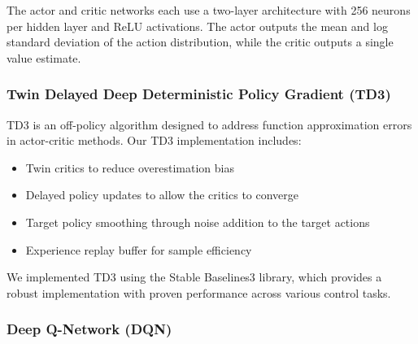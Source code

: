 \documentclass[12pt]{article}
\begin{document}
The actor and critic networks each use a two-layer architecture with 256 neurons per hidden layer and ReLU activations. The actor outputs the mean and log standard deviation of the action distribution, while the critic outputs a single value estimate.


\subsubsection{Twin Delayed Deep Deterministic Policy Gradient (TD3)}

TD3 is an off-policy algorithm designed to address function approximation errors in actor-critic methods. Our TD3 implementation includes:


\begin{itemize}
    \item Twin critics to reduce overestimation bias
    \item Delayed policy updates to allow the critics to converge
    \item Target policy smoothing through noise addition to the target actions
    \item Experience replay buffer for sample efficiency
\end{itemize}


We implemented TD3 using the Stable Baselines3 library, which provides a robust implementation with proven performance across various control tasks.


\subsubsection{Deep Q-Network (DQN)}
\end{document}
